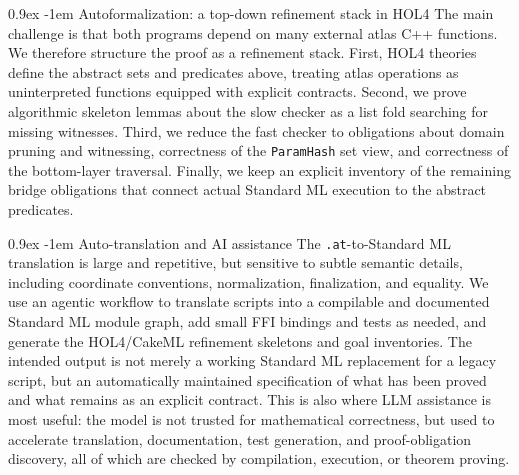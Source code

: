 \documentclass{easychair}
\makeatletter
\def\atlas{\textsf{atlas}\xspace}
\def\sml{\textsf{Standard ML}\xspace}
\def\holfour{\textsf{HOL4}\xspace}
\def\cakeml{\textsf{CakeML}\xspace}
\renewcommand\paragraph{\@startsection{paragraph}{4}{\z@}%
  {0.9ex}   %
  {-1em}    %
  {\normalfont\normalsize\bfseries}}
\makeatother
\begin{document}
\paragraph{Autoformalization: a top-down refinement stack in \holfour}
The main challenge is that both programs depend on many external \atlas{} C++
functions.  We therefore structure the proof as a refinement stack.  First,
\holfour theories define the abstract sets and predicates above, treating
\atlas{} operations as uninterpreted functions equipped with explicit
contracts.  Second, we prove algorithmic skeleton lemmas about the slow checker
as a list fold searching for missing witnesses.  Third, we reduce the fast
checker to obligations about domain pruning and witnessing, correctness of the
\texttt{ParamHash} set view, and correctness of the bottom-layer traversal.
Finally, we keep an explicit inventory of the remaining bridge obligations that
connect actual \sml execution to the abstract predicates.

\paragraph{Auto-translation and AI assistance}
The \texttt{.at}-to-\sml translation is large and repetitive, but sensitive to
subtle semantic details, including coordinate conventions, normalization,
finalization, and equality.  We use an agentic workflow to translate scripts
into a compilable and documented \sml module graph, add small FFI bindings and
tests as needed, and generate the \holfour/\cakeml refinement skeletons and
goal inventories.  The intended output is not merely a working \sml replacement
for a legacy script, but an automatically maintained specification of what has
been proved and what remains as an explicit contract.
\iffalse
This is also where LLM
assistance is most useful: the model is not trusted for mathematical
correctness, but used to accelerate translation, documentation, test generation,
and proof-obligation discovery, all of which are checked by compilation,
execution, or theorem proving.
\end{document}
